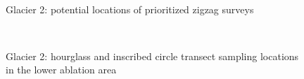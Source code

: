 \documentclass{sfuthesis}
\begin{document}
\begin{appendices}
	\begin{figure}[H]
	\centering
	\\
\caption[]{Glacier 2: potential locations of prioritized zigzag surveys}
\end{figure}
	\begin{figure}[H]
	\centering
	\\
\caption[]{Glacier 2: hourglass and inscribed circle transect sampling locations in the lower ablation area}
\end{figure}
	\begin{figure}[H]
	\centering

\end{figure}
\end{appendices}
\end{document}
